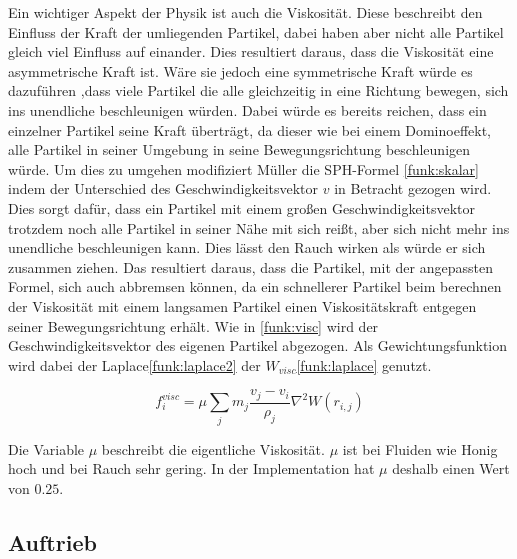 \documentclass[intern,palatino]{cgBA}
\begin{document}
Ein wichtiger Aspekt der Physik ist auch die Viskosität. Diese beschreibt den Einfluss der Kraft der umliegenden Partikel, dabei haben aber nicht alle Partikel gleich viel Einfluss auf einander. Dies resultiert daraus, dass die Viskosität eine asymmetrische Kraft ist.   Wäre sie jedoch eine symmetrische Kraft würde es dazuführen ,dass viele Partikel die alle gleichzeitig in eine Richtung bewegen, sich ins unendliche beschleunigen würden. Dabei würde es bereits reichen, dass ein einzelner Partikel seine Kraft überträgt, da dieser wie bei einem Dominoeffekt, alle Partikel in seiner Umgebung in seine Bewegungsrichtung beschleunigen würde. Um dies zu umgehen modifiziert Müller \cite{muller2003particle} die SPH-Formel \ref{funk:skalar} indem der Unterschied des Geschwindigkeitsvektor $v$ in Betracht gezogen wird. Dies sorgt dafür, dass ein Partikel mit einem großen Geschwindigkeitsvektor trotzdem noch alle Partikel in seiner Nähe mit sich reißt, aber sich nicht mehr ins unendliche beschleunigen kann.
\newline
Dies lässt den Rauch wirken als würde er sich zusammen ziehen. Das resultiert daraus, dass die Partikel, mit der angepassten Formel, sich auch abbremsen können, da ein schnellerer Partikel beim berechnen der Viskosität mit einem langsamen Partikel einen Viskositätskraft entgegen seiner Bewegungsrichtung erhält. 
\newline
Wie in \ref{funk:visc} wird der Geschwindigkeitsvektor des eigenen Partikel abgezogen. Als Gewichtungsfunktion wird dabei der Laplace\ref{funk:laplace2} der $W_{visc}$\ref{funk:laplace} genutzt.

\begin{equation}\label{funk:visc}
f^{visc}_i  = \mu \sum_j m_j \frac{v_j-v_i}{\rho_j} \nabla^2 W(r_{i,j})
\end{equation}

Die Variable $\mu$ beschreibt die eigentliche Viskosität. $\mu$ ist bei Fluiden wie Honig hoch und bei Rauch sehr gering. In der Implementation hat $\mu$ deshalb einen Wert von $0.25$.


\subsection{Auftrieb}\label{auftrieb}
\end{document}
